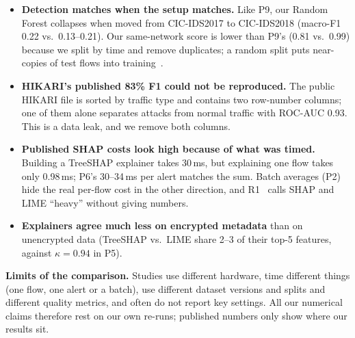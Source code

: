 \begin{itemize}[leftmargin=*, itemsep=0pt]
  \item \textbf{Detection matches when the setup matches.} Like P9, our Random Forest collapses when moved from CIC-IDS2017 to CIC-IDS2018 (macro-F1 0.22 vs.\ 0.13--0.21). Our same-network score is lower than P9's (0.81 vs.\ 0.99) because we split by time and remove duplicates; a random split puts near-copies of test flows into training~\cite{arp2022}.
  \item \textbf{HIKARI's published 83\% F1 could not be reproduced.} The public HIKARI file is sorted by traffic type and contains two row-number columns; one of them alone separates attacks from normal traffic with ROC-AUC 0.93. This is a data leak, and we remove both columns.
  \item \textbf{Published SHAP costs look high because of what was timed.} Building a TreeSHAP explainer takes 30\,ms, but explaining one flow takes only 0.98\,ms; P6's 30--34\,ms per alert matches the sum. Batch averages (P2) hide the real per-flow cost in the other direction, and R1~\cite{kalakoti2026} calls SHAP and LIME ``heavy'' without giving numbers.
  \item \textbf{Explainers agree much less on encrypted metadata} than on unencrypted data (TreeSHAP vs.\ LIME share 2--3 of their top-5 features, against $\kappa=0.94$ in P5).
\end{itemize}
\textbf{Limits of the comparison.} Studies use different hardware, time different things (one flow, one alert or a batch), use different dataset versions and splits and different quality metrics, and often do not report key settings. All our numerical claims therefore rest on our own re-runs; published numbers only show where our results sit.

